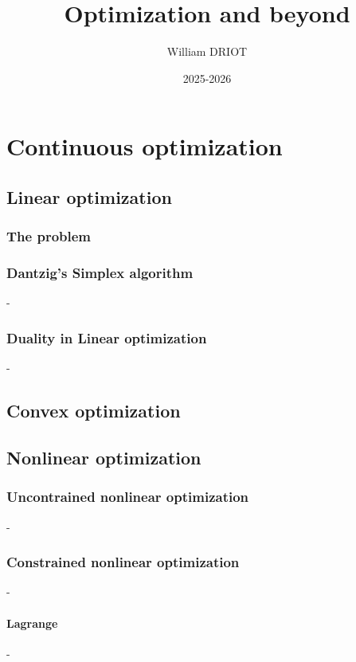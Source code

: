 \documentclass[12pt,openany,oneside]{book}
\title{\textbf{Optimization and beyond}}
\author{William DRIOT}
\date{2025-2026}
\theoremstyle{definition}
\numberwithin{definition}{section}
\numberwithin{theorem}{section}
\numberwithin{corollary}{section}
\numberwithin{proposition}{section}
\numberwithin{notation}{section}
\numberwithin{remark}{section}
\numberwithin{hypothesis}{section}
\numberwithin{example}{section}
\begin{document}
\maketitle

\tableofcontents

\setlength{\parindent}{15pt}
\setlength{\parskip}{6pt}

\newpage



\part{Continuous optimization}

\chapter{Linear optimization}

\section{The problem}

\section{Dantzig's Simplex algorithm}-
\section{Duality in Linear optimization}-



\chapter{Convex optimization}

\chapter{Nonlinear optimization}

\section{Uncontrained nonlinear optimization}-
\section{Constrained nonlinear optimization}-
\subsection{Lagrange}-
\end{document}
